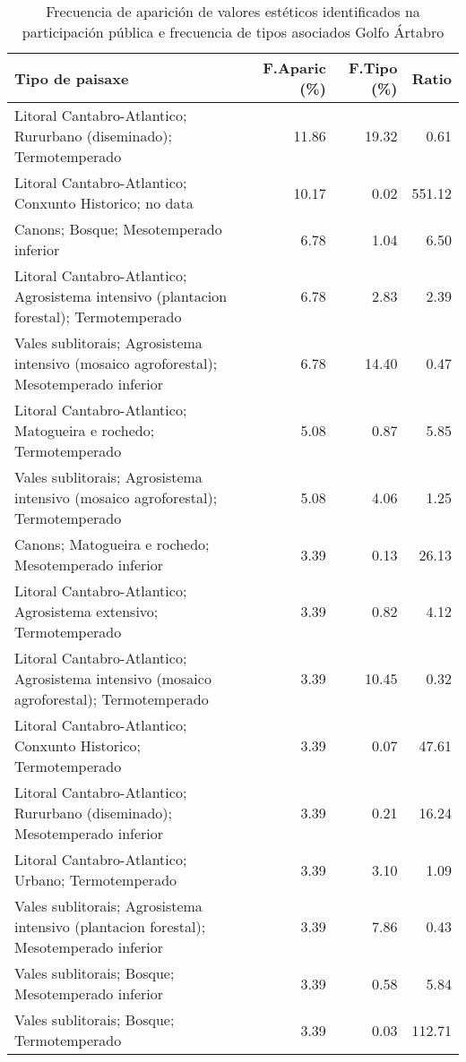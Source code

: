 \begin{table}[p]
\centering
\caption{Frecuencia de aparición de valores estéticos identificados na participación pública e frecuencia de tipos asociados Golfo Ártabro} 
\label{vsixotest1}
\begin{tabular}{lrrr}
  \hline
Tipo de paisaxe & F.Aparic (\%) & F.Tipo (\%) & Ratio \\ 
  \hline
Litoral Cantabro-Atlantico; Rururbano (diseminado); Termotemperado & 11.86 & 19.32 & 0.61 \\ 
  Litoral Cantabro-Atlantico; Conxunto Historico; no data & 10.17 & 0.02 & 551.12 \\ 
  Canons; Bosque; Mesotemperado inferior & 6.78 & 1.04 & 6.50 \\ 
  Litoral Cantabro-Atlantico; Agrosistema intensivo (plantacion forestal); Termotemperado & 6.78 & 2.83 & 2.39 \\ 
  Vales sublitorais; Agrosistema intensivo (mosaico agroforestal); Mesotemperado inferior & 6.78 & 14.40 & 0.47 \\ 
  Litoral Cantabro-Atlantico; Matogueira e rochedo; Termotemperado & 5.08 & 0.87 & 5.85 \\ 
  Vales sublitorais; Agrosistema intensivo (mosaico agroforestal); Termotemperado & 5.08 & 4.06 & 1.25 \\ 
  Canons; Matogueira e rochedo; Mesotemperado inferior & 3.39 & 0.13 & 26.13 \\ 
  Litoral Cantabro-Atlantico; Agrosistema extensivo; Termotemperado & 3.39 & 0.82 & 4.12 \\ 
  Litoral Cantabro-Atlantico; Agrosistema intensivo (mosaico agroforestal); Termotemperado & 3.39 & 10.45 & 0.32 \\ 
  Litoral Cantabro-Atlantico; Conxunto Historico; Termotemperado & 3.39 & 0.07 & 47.61 \\ 
  Litoral Cantabro-Atlantico; Rururbano (diseminado); Mesotemperado inferior & 3.39 & 0.21 & 16.24 \\ 
  Litoral Cantabro-Atlantico; Urbano; Termotemperado & 3.39 & 3.10 & 1.09 \\ 
  Vales sublitorais; Agrosistema intensivo (plantacion forestal); Mesotemperado inferior & 3.39 & 7.86 & 0.43 \\ 
  Vales sublitorais; Bosque; Mesotemperado inferior & 3.39 & 0.58 & 5.84 \\ 
  Vales sublitorais; Bosque; Termotemperado & 3.39 & 0.03 & 112.71 \\ 

\end{tabular}
\end{table}
